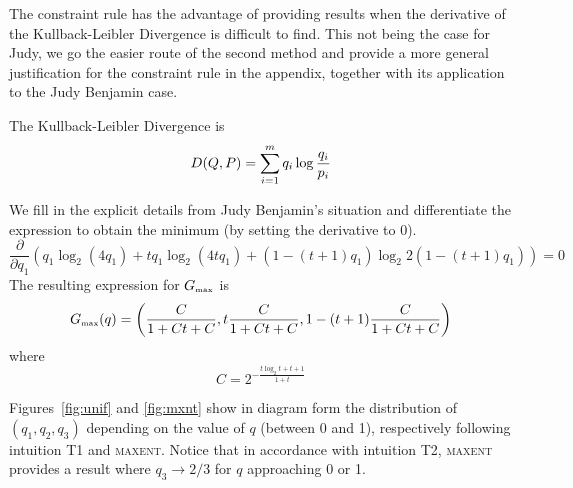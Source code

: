 \documentclass[12pt]{article}
\begin{document}
The constraint rule has the advantage of providing results when the
derivative of the Kullback-Leibler Divergence is difficult to find.
This not being the case for Judy, we go the easier route of the second
method and provide a more general justification for the constraint
rule in the appendix, together with its application to the Judy
Benjamin case. 

The Kullback-Leibler Divergence is
\begin{equation}
  D(Q,P)=\sum_{i=1}^{m}q_{i}\log\frac{q_{i}}{p_{i}}\notag
\end{equation}

We fill in the explicit details from Judy Benjamin's situation and
differentiate the expression to obtain the minimum (by setting the
derivative to $0$). 
\begin{displaymath}
\frac{\partial}{\partial{}q_{1}}(q_{1}\log_{2}(4q_{1})+tq_{1}\log_{2}(4tq_{1})+(1-(t+1)q_{1})\log_{2}2(1-(t+1)q_{1}))=0
\end{displaymath}
The resulting expression for $G_{\mbox{\tiny max}}$ is
\begin{displaymath}
  G_{\mbox{\tiny max}}(q)=\left(\frac{C}{1+Ct+C},t\frac{C}{1+Ct+C},1-(t+1)\frac{C}{1+Ct+C}\right)
\end{displaymath}
where
\begin{displaymath}
  C=2^{-\frac{t\log_{2}t+t+1}{1+t}}
\end{displaymath}

Figures~\ref{fig:unif} and \ref{fig:mxnt} show in diagram form the
distribution of $(q_{1},q_{2},q_{3})$ depending on the value of $q$
(between 0 and 1), respectively following intuition T1 and
\textsc{maxent}. Notice that in accordance with intuition T2,
\textsc{maxent} provides a result where $q_{3}\rightarrow{}2/3$ for
$q$ approaching 0 or 1.
\end{document}
